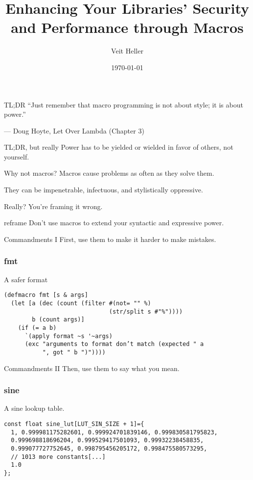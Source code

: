 \documentclass[aspectratio=169]{beamer}
\title{Enhancing Your Libraries’ Security and Performance through Macros}
\date{\today}
\author{Veit Heller}
\institute{Clojure Meetup Berlin}
\begin{document}
  \maketitle
  \begin{frame}{TL;DR}
    \Large “Just remember that macro programming is not about style; it is about
    power.”

    — Doug Hoyte, Let Over Lambda (Chapter 3)
  \end{frame}
  \begin{frame}{TL;DR, but really}
    \Large Power has to be yielded or wielded in favor of others, not yourself.
  \end{frame}
  \begin{frame}{Why not macros?}
    \Large Macros cause problems as often as they solve them.

    \Large They can be impenetrable, infectuous, and stylistically oppressive.
  \end{frame}
  \begin{frame}{Really?}
    \Large You’re framing it wrong.
  \end{frame}
  \begin{frame}{reframe}
    \Large Don’t use macros to extend your syntactic and expressive power.
  \end{frame}
  \begin{frame}{Commandments I}
    \Large First, use them to make it harder to make mistakes.
  \end{frame}
  \begin{frame}[fragile]
    \frametitle{fmt}
    \begin{listing}[H]
      \caption{A safer format}
      \begin{verbatim}
(defmacro fmt [s & args]
  (let [a (dec (count (filter #(not= "" %)
                              (str/split s #"%"))))
        b (count args)]
    (if (= a b)
      `(apply format ~s '~args)
      (exc "arguments to format don’t match (expected " a
           ", got " b ")"))))
      \end{verbatim}
    \end{listing}
  \end{frame}
  \begin{frame}{Commandments II}
    \Large Then, use them to say what you mean.
  \end{frame}
  \begin{frame}[fragile]
    \frametitle{sine}
    \begin{listing}[H]
      \caption{A sine lookup table.}
      \begin{verbatim}
const float sine_lut[LUT_SIN_SIZE + 1]={
  1, 0.999981175282601, 0.999924701839146, 0.999830581795823,
  0.999698818696204, 0.999529417501093, 0.99932238458835,
  0.999077727752645, 0.998795456205172, 0.998475580573295,
  // 1013 more constants[...]
  1.0
};
      \end{verbatim}
    \end{listing}
  \end{frame}
\end{document}
